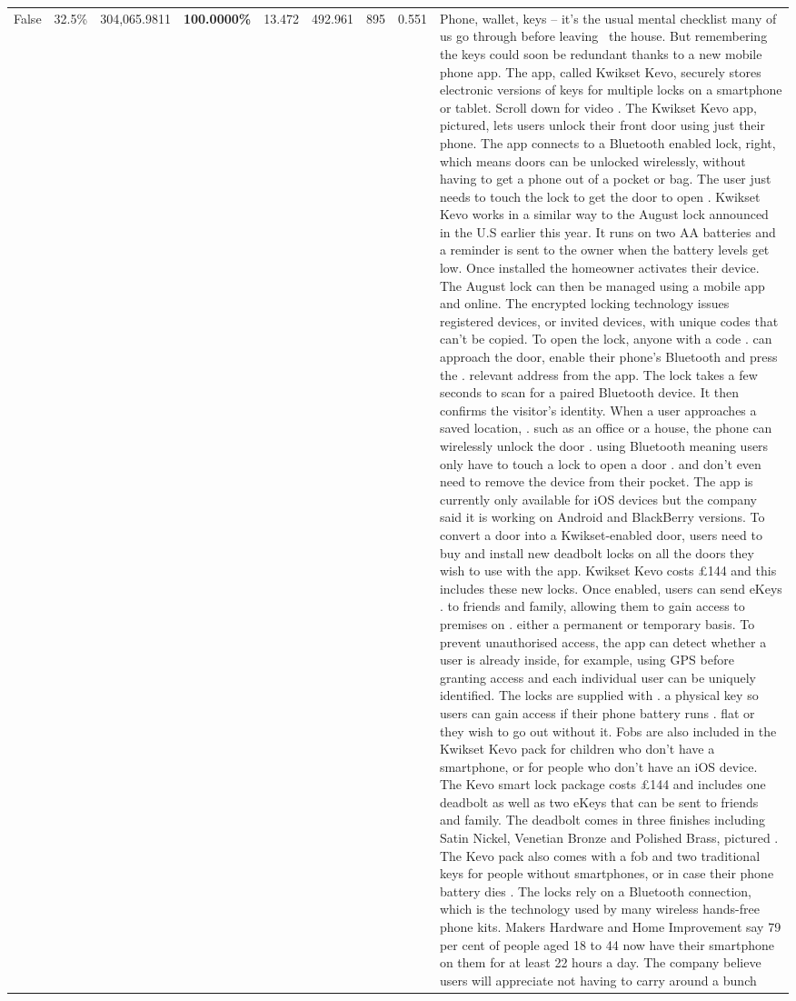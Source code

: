 \begin{table}[H]
\begin{tabular}{lllrlllll}
False & 32.5\% & 304,065.9811 & \bfseries \color{red} 100.0000\% & 13.472 & 492.961 & 895 & 0.551 & Phone, wallet, keys – it’s the usual mental checklist many of us go through before leaving  the house. But remembering the keys could soon be redundant thanks to a new mobile phone app. The app, called Kwikset Kevo, securely stores electronic versions of keys for multiple locks on a smartphone or tablet. Scroll down for video . The Kwikset Kevo app, pictured, lets users unlock their front door using just their phone. The app connects to a Bluetooth enabled lock, right, which means doors can be unlocked wirelessly, without having to get a phone out of a pocket or bag. The user just needs to touch the lock to get the door to open . Kwikset Kevo works in a similar way to the August lock announced in the U.S earlier this year. It runs on two AA batteries and a reminder is sent to the owner when the battery levels get low. Once installed the homeowner activates their device. The August lock can then be managed using a mobile app and online. The encrypted locking technology issues registered devices, or invited devices, with unique codes that can't be copied. To open the lock, anyone with a code . can approach the door, enable their phone's Bluetooth and press the . relevant address from the app. The lock takes a few seconds to scan for a paired Bluetooth device. It then confirms the visitor's identity. When a user approaches a saved location, . such as an office or a house, the phone can wirelessly unlock the door . using Bluetooth meaning users only have to touch a lock to open a door . and don't even need to remove the device from their pocket. The app is currently only available for iOS devices but the company said it is working on Android and BlackBerry versions. To convert a door into a Kwikset-enabled door, users need to buy and install new deadbolt locks on all the doors they wish to use with the app. Kwikset Kevo costs £144 and this includes these new locks. Once enabled, users can send eKeys . to friends and family, allowing them to gain access to premises on . either a permanent or temporary basis. To prevent unauthorised access, the app can detect whether a user is already inside, for example, using GPS before granting access and each individual user can be uniquely identified. The locks are supplied with . a physical key so users can gain access if their phone battery runs . flat or they wish to go out without it. Fobs are also included in the Kwikset Kevo pack for children who don't have a smartphone, or for people who don't have an iOS device. The Kevo smart lock package costs £144 and includes one deadbolt as well as two eKeys that can be sent to friends and family. The deadbolt comes in three finishes including Satin Nickel, Venetian Bronze and Polished Brass, pictured . The Kevo pack also comes with a fob and two traditional keys for people without smartphones, or in case their phone battery dies . The locks rely on a Bluetooth connection, which is the technology used by many wireless hands-free phone kits. Makers Hardware and Home Improvement say 79 per cent of people aged 18 to 44 now have their smartphone on them for at least 22 hours a day. The company believe users will appreciate not having to carry around a bunch 
\end{tabular}
\end{table}

